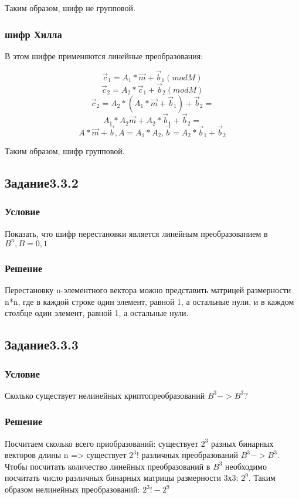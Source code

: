 \documentclass[10pt,a4paper]{article}
\begin{document}
Таким образом, шифр не групповой.

\subsubsection*{шифр Хилла}

В этом шифре применяются линейные преобразования:

$$ \vec c_1 = A_1 * \vec m + \vec b_1 (mod M) $$
$$ \vec c_2 = A_2 * \vec c_1 + \vec b_2 (mod M) $$
$$ \vec c_2 = A_2 * (A_1 * \vec m + \vec b_1) + \vec b_2 = $$
$$ A_1*A_2 \vec m + A_2 * \vec b_1 + \vec b_2 = $$
$$ A * \vec m + \vec b, A = A_1*A_2, \vec b = A_2 * \vec b_1 + \vec b_2 $$

Таким образом, шифр групповой.


\subsection*{Задание3.3.2}
\subsubsection*{Условие}
Показать, что шифр перестановки является линейным преобразованием в
$ B^n, B={0,1} $
\subsubsection*{Решение}
Перестановку n-элементного вектора можно представить матрицей
размерности n*n, где в каждой строке один элемент, равной 1, а
остальные нули, и в каждом столбце один элемент, равной 1, а
остальные нули.

\subsection*{Задание3.3.3}
\subsubsection*{Условие}
Сколько существует нелинейных криптопреобразований $ B^3->B^3 $? 
\subsubsection*{Решение}
Посчитаем сколько всего приобразований:
существует $ 2^3 $ разных бинарных векторов длины n => существует $
2^3! $ различных преобразований $ B^3->B^3 $.
Чтобы посчитать количество линейных преобразований в $ B^3 $
необходимо посчитать число различных  бинарных матрицы размерности
3х3: $ 2^9 $. Таким образом нелинейных преобразований: $ 2^3! - 2^9 $
\end{document}
